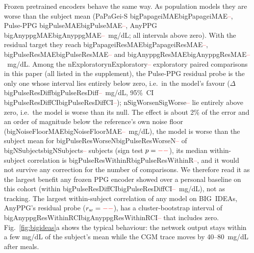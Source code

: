 \documentclass[journal]{IEEEtran}
\newcommand{\m}[1]{\ifcsname #1\endcsname\csname #1\endcsname\else\textcolor{red}{--}\fi}
\begin{document}
Frozen pretrained encoders behave the same way.  As population models they
are worse than the subject mean (PaPaGei-S \m{bigPapageiMAE}, Pulse-PPG
\m{bigPulseMAE}, AnyPPG \m{bigAnyppgMAE}~mg/dL; all intervals above zero).
With the residual target they reach \m{bigPapageiResMAE}, \m{bigPulseResMAE}
and \m{bigAnyppgResMAE}~mg/dL.  Among the \m{nExploratory} exploratory
paired comparisons in this paper (all listed in the supplement), the
Pulse-PPG residual probe is the only one whose interval lies entirely below
zero, i.e.\ in the model's favour ($\Delta$ \m{bigPulseResDiff}~mg/dL, 95\%~CI
\m{bigPulseResDiffCI}); \m{nSigWorse} lie entirely above zero, i.e.\ the model
is worse than its null.  The effect is about 2\% of the error and an order
of magnitude below the reference's own noise floor
(\m{bigNoiseFloorMAE}~mg/dL), the model is worse than the subject mean for
\m{bigPulseResWorseN} of \m{bigNSubjects} subjects (sign test
$p=\m{bigPulseResSignP}$), its median within-subject correlation is
\m{bigPulseResWithinR}, and it would not survive any correction for the
number of comparisons.  We therefore read it as the largest benefit any
frozen PPG encoder showed over a personal baseline on this cohort (within
\m{bigPulseResDiffCI}~mg/dL), not as tracking.  The largest within-subject
correlation of any model on BIG~IDEAs, AnyPPG's
residual probe ($r_w=\m{bigAnyppgResWithinR}$), has a cluster-bootstrap
interval of \m{bigAnyppgResWithinRCI} that includes zero.
Fig.~\ref{fig:bigideas}a
shows the typical behaviour: the network output stays within a few mg/dL of
the subject's mean while the CGM trace moves by 40--80~mg/dL after meals.
\end{document}
